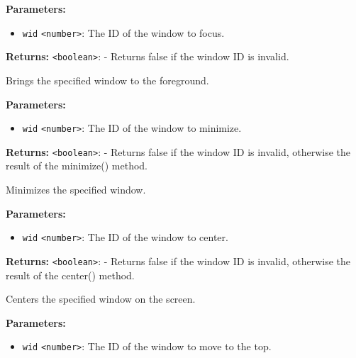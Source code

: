 \documentclass[12pt,a4paper]{article}
\begin{document}
\noindent \textbf{Parameters:}
\begin{itemize}
  \item \texttt{wid} \texttt{<number>}: The ID of the window to focus.
\end{itemize}

\noindent \textbf{Returns:} \texttt{<boolean>}: - Returns false if the window ID is invalid.

\noindent Brings the specified window to the foreground.

\vspace{5mm}
\noindent {}


\noindent \textbf{Parameters:}
\begin{itemize}
  \item \texttt{wid} \texttt{<number>}: The ID of the window to minimize.
\end{itemize}

\noindent \textbf{Returns:} \texttt{<boolean>}: - Returns false if the window ID is invalid, otherwise the result of the minimize() method.

\noindent Minimizes the specified window.

\vspace{5mm}
\noindent {}


\noindent \textbf{Parameters:}
\begin{itemize}
  \item \texttt{wid} \texttt{<number>}: The ID of the window to center.
\end{itemize}

\noindent \textbf{Returns:} \texttt{<boolean>}: - Returns false if the window ID is invalid, otherwise the result of the center() method.

\noindent Centers the specified window on the screen.

\vspace{5mm}
\noindent {}


\noindent \textbf{Parameters:}
\begin{itemize}
  \item \texttt{wid} \texttt{<number>}: The ID of the window to move to the top.
\end{itemize}
\end{document}
